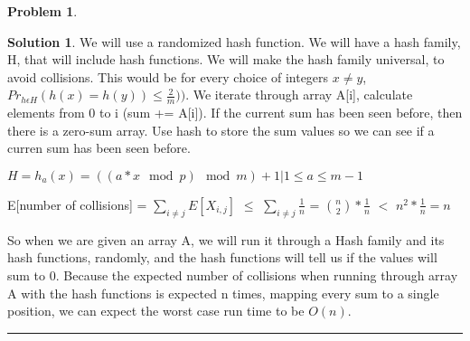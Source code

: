 \documentclass{article}
\theoremstyle{definition}
\newtheorem{problem}{Problem}
\def\fline{\rule{0.75\linewidth}{0.5pt}}
\newcommand{\finishline}{\begin{center}\fline\end{center}}
\newtheorem*{solution*}{Solution}
\newenvironment{solution}{\begin{solution*}}{{\finishline} \end{solution*}}
\begin{document}
\begin{problem}
\begin{enumerate}
	\begin{solution}
		We will use a randomized hash function. We will have a hash family, H, that will include hash functions. We will make the hash family universal, to avoid collisions. This would be for every choice of integers $x \neq y$, $Pr_{h\epsilon H} (h(x) = h(y)) \leq \frac{2}{m}))$. We iterate through array A[i], calculate elements from 0 to i (sum += A[i]). If the current sum has been seen before, then there is a zero-sum array.  Use hash to store the sum values so we can see if a curren sum has been seen before. 
		\item $H = {h_a(x) = ((a * x \mod p) \mod m) + 1 | 1 \leq a \leq m- 1}$
		\item E[number of collisions] = ${\sum_{i \neq j} E[X_{i,j}] }$ $\leq$ $\sum_{i \neq j} \frac{1}{n}$ = ${n \choose 2} * \frac{1}{n}$ $<$ $n^2 * \frac{1}{n} = n$
		\item So when we are given an array A, we will run it through a Hash family and its hash functions, randomly, and the hash functions will tell us if the values will sum to 0. Because the expected number of collisions when running through array A with the hash functions is expected n times, mapping every sum to a single position, we can expect the worst case run time to be $O(n)$.
	\end{solution}
	
\end{enumerate}

\end{problem}
\end{document}
